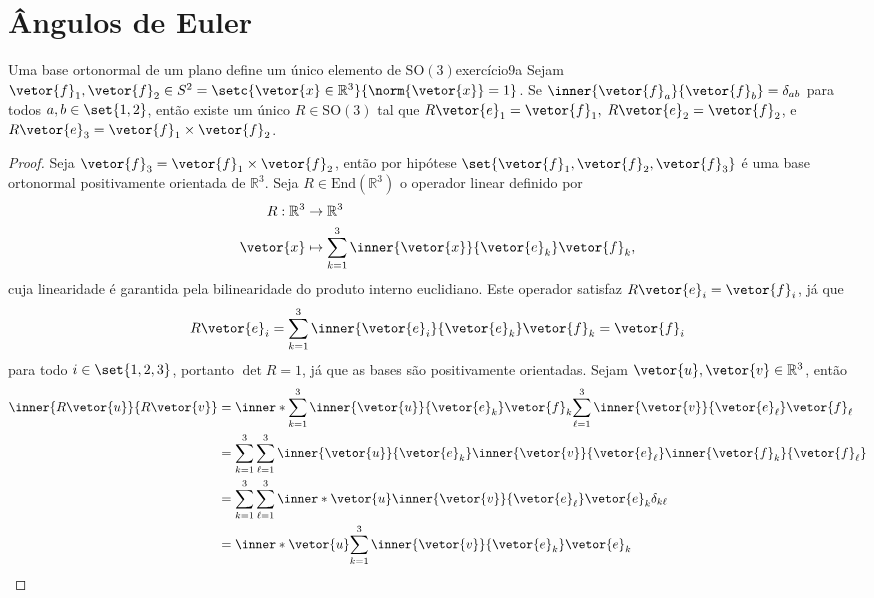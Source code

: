 \section{Ângulos de Euler}

\begin{lemma}{Uma base ortonormal de um plano define um único elemento de \(\mathrm{SO}(3)\)}{exercício9a}
    Sejam \(\vetor{f}_1, \vetor{f}_2 \in S^2 = \setc{\vetor{x} \in \mathbb{R}^3}{\norm{\vetor{x}}=1}\). Se \(\inner{\vetor{f}_a}{\vetor{f}_b} = \delta_{ab}\) para todos \(a,b \in \set{1,2}\), então existe um único \(R \in \mathrm{SO}(3)\) tal que \(R\vetor{e}_1 = \vetor{f}_1,\) \(R\vetor{e}_2 = \vetor{f}_2\), e \(R\vetor{e}_3 = \vetor{f}_1\times\vetor{f}_2\).
\end{lemma}
\begin{proof}
    Seja \(\vetor{f}_3 = \vetor{f}_1 \times \vetor{f}_2\), então por hipótese \(\set{\vetor{f}_1, \vetor{f}_2, \vetor{f}_3}\) é uma base ortonormal positivamente orientada de \(\mathbb{R}^3\). Seja \(R \in \mathrm{End}(\mathbb{R}^3)\) o operador linear definido por
    \begin{align*}
        R : \mathbb{R}^3 &\to \mathbb{R}^3\\
               \vetor{x} &\mapsto \sum_{k = 1}^3 \inner{\vetor{x}}{\vetor{e}_k}\vetor{f}_k,
    \end{align*}
    cuja linearidade é garantida pela bilinearidade do produto interno euclidiano. Este operador satisfaz \(R\vetor{e}_i = \vetor{f}_i\), já que
    \begin{equation*}
        R\vetor{e}_i = \sum_{k = 1}^3\inner{\vetor{e}_i}{\vetor{e}_k}\vetor{f}_k = \vetor{f}_i
    \end{equation*}
    para todo \(i \in \set{1,2,3}\), portanto \(\det{R} = 1\), já que as bases são positivamente orientadas. Sejam \(\vetor{u}, \vetor{v} \in \mathbb{R}^3\), então
    \begin{align*}
        \inner{R\vetor{u}}{R\vetor{v}}
        &= \inner*{\sum_{k = 1}^3\inner{\vetor{u}}{\vetor{e}_k}\vetor{f}_k}{\sum_{\ell = 1}^3\inner{\vetor{v}}{\vetor{e}_\ell}\vetor{f}_\ell}\\
        &= \sum_{k = 1}^3 \sum_{\ell = 1}^3 \inner{\vetor{u}}{\vetor{e}_k}\inner{\vetor{v}}{\vetor{e}_\ell}\inner{\vetor{f}_k}{\vetor{f}_\ell}\\
        &= \sum_{k = 1}^3 \sum_{\ell = 1}^3\inner*{\vetor{u}}{\inner{\vetor{v}}{\vetor{e}_\ell}\vetor{e}_k} \delta_{k \ell}\\
        &= \inner*{\vetor{u}}{\sum_{k = 1}^3\inner{\vetor{v}}{\vetor{e}_k}\vetor{e}_k}\\

\end{align*}
\end{proof}
